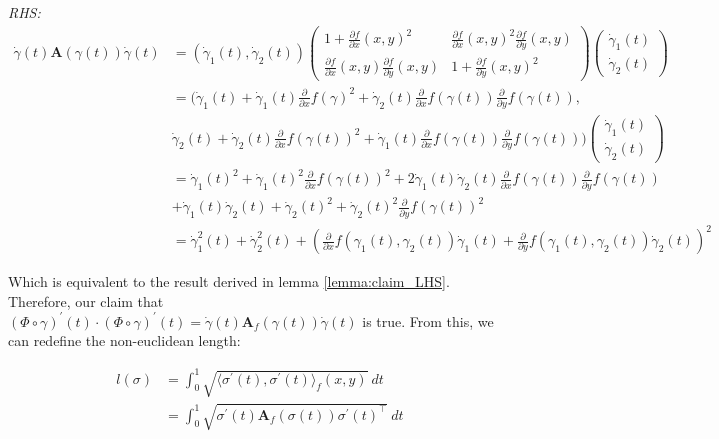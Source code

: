 \documentclass[12pt]{article}
\begin{document}
	
	\vspace{5pt}\noindent\emph{RHS:}
	\begin{align}
		\dot \gamma(t) \bm{A}(\gamma(t)) \dot \gamma(t) &= 
		(\dot \gamma_1(t), \dot \gamma_2(t))      
		\begin{pmatrix}
			1 + \frac{\partial f}{\partial x}(x, y)^2 & \frac{\partial f}{\partial x}(x, y)^2\frac{\partial f}{\partial y}(x, y) \\
			\frac{\partial f}{\partial x}(x, y)\frac{\partial f}{\partial y}(x, y) & 1 + \frac{\partial f}{\partial y}(x, y)^2
		\end{pmatrix}
		\begin{pmatrix}
			\dot \gamma_1(t) \\ \dot \gamma_2(t)
		\end{pmatrix} \\
		&= (\dot \gamma_1(t) + \dot \gamma_1(t) \frac{\partial}{\partial x}f(\gamma)^2 + \dot \gamma_2(t) \frac{\partial}{\partial x}f(\gamma(t))\frac{\partial}{\partial y}f(\gamma(t)), \\ 
		& \dot \gamma_2(t) + \dot \gamma_2(t) \frac{\partial}{\partial x}f(\gamma(t))^2 + \dot \gamma_1(t) \frac{\partial}{\partial x}f(\gamma(t))\frac{\partial}{\partial y}f(\gamma(t)))
		\begin{pmatrix}
			\dot \gamma_1(t) \\ \dot \gamma_2(t)
		\end{pmatrix} \\
		&= \dot \gamma_1(t)^2 + \dot \gamma_1(t)^2 \frac{\partial}{\partial x}f(\gamma(t))^2 + 2\dot \gamma_1(t) \dot \gamma_2(t) \frac{\partial}{\partial x}f(\gamma(t)) \frac{\partial}{\partial y}f(\gamma(t)) \\ &+ \dot \gamma_1(t) \dot \gamma_2(t) + \dot \gamma_2(t)^2 + \dot \gamma_2(t)^2 \frac{\partial}{\partial y}f(\gamma(t))^2 \\
		&=  \dot \gamma^{2}_1(t) + \dot \gamma^{2}_2(t) + (\frac{\partial}{\partial x}f(\gamma_1(t), \gamma_2(t))\dot \gamma_1(t) + \frac{\partial}{\partial y}f(\gamma_1(t), \gamma_2(t))\dot \gamma_2(t))^2
	\end{align}
	
	Which is equivalent to the result derived in lemma \ref{lemma:claim_LHS}. Therefore, our claim that $(\Phi \circ \gamma)^{\prime}(t) \cdot (\Phi \circ \gamma)^{\prime}(t) = \dot \gamma(t) \bm{A}_f(\gamma(t)) \dot \gamma(t)$ is true. From this, we can redefine the non-euclidean length:
	
	\begin{align}
		l(\sigma) &= \int_{0}^{1} \sqrt{\langle \sigma^{\prime}(t), \sigma^{\prime}(t) \rangle _f(x, y)} ~ dt \\ &=  \int_{0}^{1} \sqrt{\sigma^{\prime}(t)\bm{A}_f(\sigma(t))\sigma^{\prime}(t)^\intercal} ~ dt
		\label{non_euclidean_length_expression}
	\end{align}
	
\end{document}
